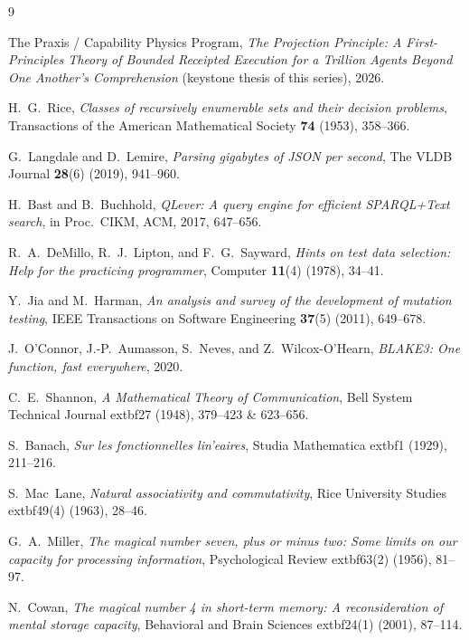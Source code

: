 \documentclass[11pt,oneside]{book}
\theoremstyle{definition}
\theoremstyle{plain}
\theoremstyle{remark}
\begin{document}
\begin{thebibliography}{9}

The Praxis / Capability Physics Program,
\emph{The Projection Principle: A First-Principles Theory of Bounded Receipted Execution for a
Trillion Agents Beyond One Another's Comprehension} (keystone thesis of this series), 2026.

H.~G.~Rice,
\emph{Classes of recursively enumerable sets and their decision problems},
Transactions of the American Mathematical Society \textbf{74} (1953), 358--366.

G.~Langdale and D.~Lemire,
\emph{Parsing gigabytes of JSON per second},
The VLDB Journal \textbf{28}(6) (2019), 941--960.

H.~Bast and B.~Buchhold,
\emph{QLever: A query engine for efficient SPARQL+Text search},
in Proc.\ CIKM, ACM, 2017, 647--656.

R.~A.~DeMillo, R.~J.~Lipton, and F.~G.~Sayward,
\emph{Hints on test data selection: Help for the practicing programmer},
Computer \textbf{11}(4) (1978), 34--41.

Y.~Jia and M.~Harman,
\emph{An analysis and survey of the development of mutation testing},
IEEE Transactions on Software Engineering \textbf{37}(5) (2011), 649--678.

J.~O'Connor, J.-P.~Aumasson, S.~Neves, and Z.~Wilcox-O'Hearn,
\emph{BLAKE3: One function, fast everywhere},
2020.


C.~E.~Shannon,
\emph{A Mathematical Theory of Communication},
Bell System Technical Journal 	extbf{27} (1948), 379--423 \& 623--656. %

S.~Banach,
\emph{Sur les fonctionnelles lin'eaires},
Studia Mathematica 	extbf{1} (1929), 211--216. %

S.~Mac~Lane,
\emph{Natural associativity and commutativity},
Rice University Studies 	extbf{49}(4) (1963), 28--46. %

G.~A.~Miller,
\emph{The m{\relax a}gical number seven, plus or minus two: Some limits on our capacity for processing information},
Psychological Review 	extbf{63}(2) (1956), 81--97. %

N.~Cowan,
\emph{The m{\relax a}gical number 4 in short-term memory: A reconsideration of mental storage capacity},
Behavioral and Brain Sciences 	extbf{24}(1) (2001), 87--114. %


\end{thebibliography}
\end{document}
